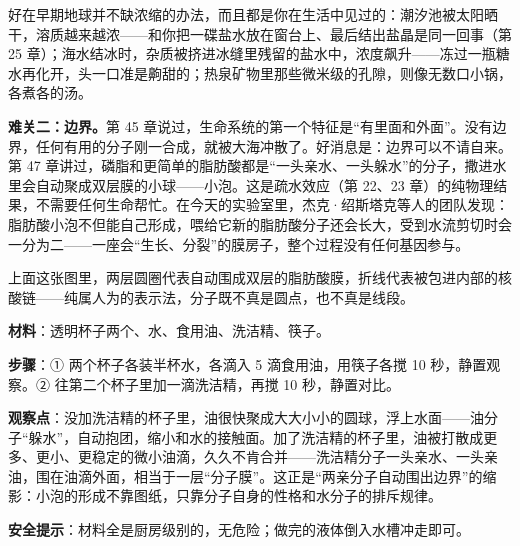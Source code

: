 好在早期地球并不缺浓缩的办法，而且都是你在生活中见过的：潮汐池被太阳晒干，溶质越来越浓——和你把一碟盐水放在窗台上、最后结出盐晶是同一回事（第 25 章）；海水结冰时，杂质被挤进冰缝里残留的盐水中，浓度飙升——冻过一瓶糖水再化开，头一口准是齁甜的；热泉矿物里那些微米级的孔隙，则像无数口小锅，各煮各的汤。

\textbf{难关二：边界。}第 45 章说过，生命系统的第一个特征是“有里面和外面”。没有边界，任何有用的分子刚一合成，就被大海冲散了。好消息是：边界可以不请自来。第 47 章讲过，磷脂和更简单的脂肪酸都是“一头亲水、一头躲水”的分子，撒进水里会自动聚成双层膜的小球——小泡。这是疏水效应（第 22、23 章）的纯物理结果，不需要任何生命帮忙。在今天的实验室里，杰克·绍斯塔克等人的团队发现：脂肪酸小泡不但能自己形成，喂给它新的脂肪酸分子还会长大，受到水流剪切时会一分为二——一座会“生长、分裂”的膜房子，整个过程没有任何基因参与。

\begin{center}
\end{center}

上面这张图里，两层圆圈代表自动围成双层的脂肪酸膜，折线代表被包进内部的核酸链——纯属人为的表示法，分子既不真是圆点，也不真是线段。

\begin{shiyan}
\textbf{材料}：透明杯子两个、水、食用油、洗洁精、筷子。

\textbf{步骤}：① 两个杯子各装半杯水，各滴入 5 滴食用油，用筷子各搅 10 秒，静置观察。② 往第二个杯子里加一滴洗洁精，再搅 10 秒，静置对比。

\textbf{观察点}：没加洗洁精的杯子里，油很快聚成大大小小的圆球，浮上水面——油分子“躲水”，自动抱团，缩小和水的接触面。加了洗洁精的杯子里，油被打散成更多、更小、更稳定的微小油滴，久久不肯合并——洗洁精分子一头亲水、一头亲油，围在油滴外面，相当于一层“分子膜”。这正是“两亲分子自动围出边界”的缩影：小泡的形成不靠图纸，只靠分子自身的性格和水分子的排斥规律。

\textbf{安全提示}：材料全是厨房级别的，无危险；做完的液体倒入水槽冲走即可。
\end{shiyan}

